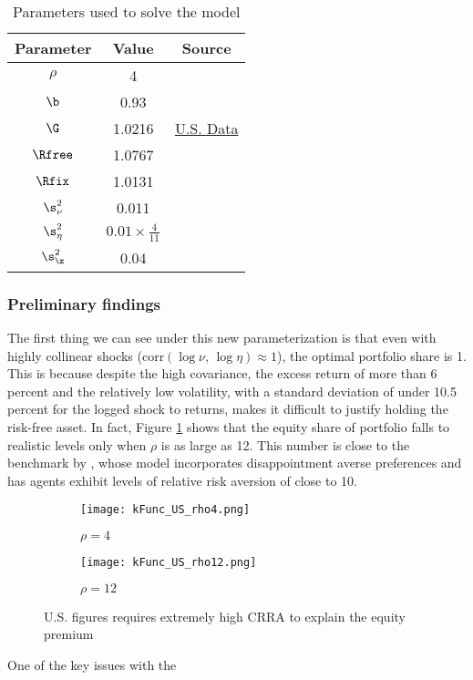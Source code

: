 \begin{table}[htbp]
    \begin{tabular}{ccc}
        \toprule
        Parameter & Value & Source\\
        \midrule
        $\rho$ & 4\\
        $\b$ & 0.93\\
        $\G$ & 1.0216 & \href{https://united-states.reaproject.org/analysis/comparative-indicators/growth_by_decade/per_capita_personal_income/reports/}{U.S. Data}\\
        $\Rfree$ & 1.0767 & \citet{Mehra2006}\\
        $\Rfix$ & 1.0131 & \citet{Mehra2006}\\
        $\s_{\nu}^2$ & 0.011 & \citet{Mehra2006}\\
        $\s_{\eta}^2$ & $0.01 \times \frac{4}{11}$ & \citet{Carroll2015}\\
        $\s_{\z}^2$ & 0.04 & \citet{Carroll2015}\\
        \bottomrule
    \end{tabular}
    \caption{Parameters used to solve the model}
    \label{tab:model_parameters}
\end{table}

\subsubsection{Preliminary findings}

The first thing we can see under this new parameterization is that even with highly collinear shocks ($\text{corr}(\log\nu,\,\log\eta) \approx 1$), the optimal portfolio share is 1. This is because despite the high covariance, the excess return of more than 6 percent and the relatively low volatility, with a standard deviation of under 10.5 percent for the logged shock to returns, makes it difficult to justify holding the risk-free asset. In fact, Figure \ref{fig:US_rho_comparison} shows that the equity share of portfolio falls to realistic levels only when $\rho$ is as large as 12. This number is close to the benchmark by \citet{Schreindorfer2020}, whose model incorporates disappointment averse preferences and has agents exhibit levels of relative risk aversion of close to 10.

\begin{figure}[h]
    \centering
    \begin{subfigure}{0.49\textwidth}
        \centering
        \texttt{[image: kFunc\_US\_rho4.png]}
        \caption{$\rho = 4$}
    \end{subfigure}
    \begin{subfigure}{0.49\textwidth}
        \centering
        \texttt{[image: kFunc\_US\_rho12.png]}
        \caption{$\rho = 12$}
    \end{subfigure}
    \caption{U.S. figures requires extremely high CRRA to explain the equity premium}
    \label{fig:US_rho_comparison}
\end{figure}

One of the key issues with the 